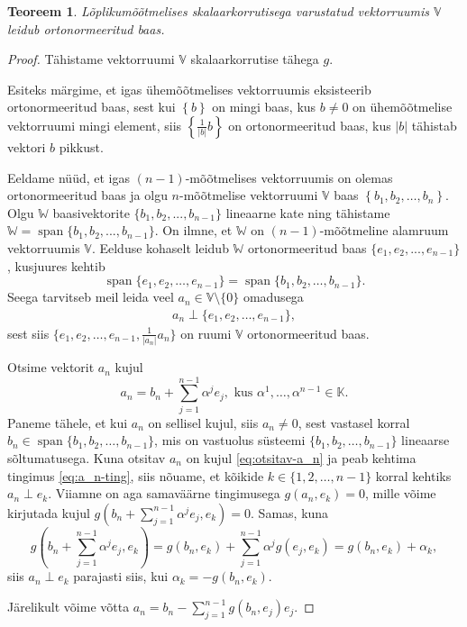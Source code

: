 \documentclass[12pt,a4paper,oneside]{article}
\theoremstyle{plain}
\newtheorem{teoreem}{Teoreem}[section]
\theoremstyle{definition}
\numberwithin{equation}{section}
\def\K{{\mathbb K}}
\def\V{{\mathbb V}}
\def\W{{\mathbb W}}
\DeclareMathOperator{\spn}{span}
\begin{document}
\begin{teoreem} \textnormal{\cite[teoreem II.7.3]{FA2}}
Lõplikumõõtmelises skalaarkorrutisega varustatud vektorruumis 
$\V$ leidub ortonormeeritud baas.
\end{teoreem}
\begin{proof}
Tähistame vektorruumi $\V$ skalaarkorrutise tähega $g$.

Esiteks märgime, et igas ühemõõtmelises vektorruumis eksisteerib 
ortonormeeritud baas, sest kui $\left\lbrace b \right\rbrace$ on 
mingi baas, kus $b \neq 0$ on ühemõõtmelise vektorruumi mingi 
element, siis $\left\lbrace \frac{1}{|b|} b\right\rbrace$ on 
ortonormeeritud baas, kus $|b|$ tähistab vektori $b$ pikkust.

Eeldame nüüd, et igas $(n-1)$-mõõtmelises vektorruumis on olemas 
ortonormeeritud baas ja olgu $n$-mõõtmelise vektorruumi 
$\V$ baas $\left\lbrace b_1, b_2, \dots, b_n \right\rbrace$. 
Olgu $\W$ baasivektorite $\{b_1,b_2,...,b_{n-1}\}$ lineaarne kate 
ning tähistame $\W = \spn\{b_1,b_2,...,b_{n-1}\}$. 
On ilmne, et $\W$ on $(n-1)$-mõõtmeline alamruum vektorruumis 
$\V$. Eelduse kohaselt leidub $\W$ ortonormeeritud baas 
$\{e_1,e_2,...,e_{n-1}\}$, kusjuures kehtib
\[ \spn\{ e_1, e_2, \dots, e_{n-1}\} = 
\spn\{ b_1, b_2, \dots, b_{n-1}\}. \]
Seega tarvitseb meil leida veel $a_n \in \V \setminus \{0\}$ 
omadusega
\begin{align} \label{eq:a_n-ting}
a_n \perp \{ e_1, e_2, \dots, e_{n-1}\},
\end{align}
sest siis $\{ e_1, e_2, \dots, e_{n-1}, \frac{1}{|a_n|}a_n\}$ on 
ruumi $\V$ ortonormeeritud baas.

Otsime vektorit $a_n$ kujul
\begin{equation} \label{eq:otsitav-a_n}
a_n = b_n + \sum_{j = 1}^{n-1} \alpha^j e_j, 
\text{ kus } \alpha^1, \dots, \alpha^{n-1} \in \K.
\end{equation}
Paneme tähele, et kui $a_n$ on sellisel kujul, siis $a_n \neq 0$, 
sest vastasel korral $b_n \in \spn\{ b_1, b_2, \dots, b_{n-1}\}$, 
mis on vastuolus süsteemi $\{ b_1, b_2, \dots, b_{n-1}\}$ 
lineaarse sõltu\-matusega.
Kuna otsitav $a_n$ on kujul \ref{eq:otsitav-a_n} ja peab kehtima 
tingimus \ref{eq:a_n-ting}, siis nõuame, et 
kõikide $k \in \{1, 2, \dots, n-1\}$ korral kehtiks 
$a_n \perp e_k$. Viiamne on aga samaväärne tingimusega 
$g\left(a_n, e_k\right) = 0$, mille võime kirjutada kujul 
$g\left(b_n + \sum_{j = 1}^{n-1} \alpha^j e_j, e_k \right) = 0$.
Samas, kuna
\begin{equation*}
g\left(b_n + \sum_{j = 1}^{n-1} \alpha^j e_j, e_k \right)= 
g\left(b_n, e_k\right) + \sum_{j = 1}^{n-1} 
	\alpha^j g\left(e_j, e_k \right) 
= g\left(b_n, e_k\right) + \alpha_k,
\end{equation*}
siis $a_n \perp e_k$ parajasti siis, kui 
$\alpha_k = - g\left(b_n, e_k\right)$. 

Järelikult võime võtta 
$a_n = b_n - \sum_{j=1}^{n-1}g\left(b_n, e_j\right)e_j$.
\end{proof}
\end{document}
